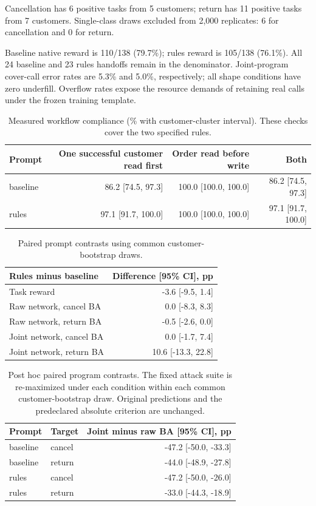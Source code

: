 Cancellation has 6 positive tasks from 5 customers; return has 11 positive tasks from 7 customers. Single-class draws excluded from 2,000 replicates: 6 for cancellation and 0 for return.

Baseline native reward is 110/138 (79.7\%); rules reward is 105/138 (76.1\%). All 24 baseline and 23 rules handoffs remain in the denominator. Joint-program cover-call error rates are 5.3\% and 5.0\%, respectively; all shape conditions have zero underfill. Overflow rates expose the resource demands of retaining real calls under the frozen training template.

\begin{table}[ht]\centering\small
\caption{Measured workflow compliance (\% with customer-cluster interval). These checks cover the two specified rules.}
\begin{tabular}{@{}lrrr@{}}\toprule
Prompt & One successful customer read first & Order read before write & Both\\\midrule
baseline & 86.2 [74.5, 97.3] & 100.0 [100.0, 100.0] & 86.2 [74.5, 97.3]\\
rules & 97.1 [91.7, 100.0] & 100.0 [100.0, 100.0] & 97.1 [91.7, 100.0]\\
\bottomrule\end{tabular}\end{table}

\begin{table}[ht]\centering\small
\caption{Paired prompt contrasts using common customer-bootstrap draws.}
\begin{tabular}{@{}lr@{}}\toprule
Rules minus baseline & Difference [95\% CI], pp\\\midrule
Task reward & -3.6 [-9.5, 1.4]\\
Raw network, cancel BA & 0.0 [-8.3, 8.3]\\
Raw network, return BA & -0.5 [-2.6, 0.0]\\
Joint network, cancel BA & 0.0 [-1.7, 7.4]\\
Joint network, return BA & 10.6 [-13.3, 22.8]\\
\bottomrule\end{tabular}\end{table}

\begin{table}[ht]\centering\small
\caption{Post hoc paired program contrasts. The fixed attack suite is re-maximized under each condition within each common customer-bootstrap draw. Original predictions and the predeclared absolute criterion are unchanged.}
\begin{tabular}{@{}llr@{}}\toprule
Prompt & Target & Joint minus raw BA [95\% CI], pp\\\midrule
baseline & cancel & -47.2 [-50.0, -33.3]\\
baseline & return & -44.0 [-48.9, -27.8]\\
rules & cancel & -47.2 [-50.0, -26.0]\\
rules & return & -33.0 [-44.3, -18.9]\\
\bottomrule\end{tabular}\end{table}

